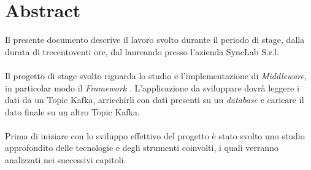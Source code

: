 \chapter*{Abstract}

Il presente documento descrive il lavoro svolto durante il periodo di stage, dalla durata di trecentoventi ore, dal laureando \myName\; presso l'azienda SyncLab S.r.l. \\ \\
Il progetto di stage svolto riguarda lo studio e l'implementazione di \textit{Middleware}, in particolar modo il \textit{Framework} .
L'applicazione da sviluppare dovrà leggere i dati da un Topic Kafka, arricchirli con dati presenti su un \textit{database} e caricare il dato finale su un altro Topic Kafka. \\ \\
Prima di iniziare con lo sviluppo effettivo del progetto è stato svolto uno studio approfondito delle tecnologie e degli strumenti coinvolti, i quali verranno analizzati nei successivi capitoli.

\newpage
